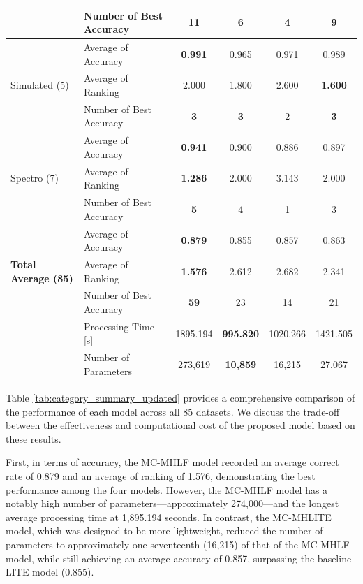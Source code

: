 \documentclass[conference]{IEEEtran}
\begin{document}
\begin{table}[tb]
{\begin{tabular}{llcccc}
      & Number of Best Accuracy & \textbf{11} & 6 & 4 & 9 \\
      \midrule
      \multirow{3}{*}{Simulated (5)} & Average of Accuracy & \textbf{0.991} & 0.965 & 0.971 & 0.989 \\
      & Average of Ranking & 2.000 & 1.800 & 2.600 & \textbf{1.600} \\
      & Number of Best Accuracy & \textbf{3} & \textbf{3} & 2 & \textbf{3} \\
      \midrule
      \multirow{3}{*}{Spectro (7)} & Average of Accuracy & \textbf{0.941} & 0.900 & 0.886 & 0.897 \\
      & Average of Ranking & \textbf{1.286} & 2.000 & 3.143 & 2.000 \\
      & Number of Best Accuracy & \textbf{5} & 4 & 1 & 3 \\
      \midrule[1pt]
      \multirow{3}{*}{\textbf{Total Average (85)}} & Average of Accuracy & \textbf{0.879} & 0.855 & 0.857 & 0.863 \\
      & Average of Ranking & \textbf{1.576} & 2.612 & 2.682 & 2.341 \\
      & Number of Best Accuracy & \textbf{59} & 23 & 14 & 21 \\
	& Processing Time [s] & 1895.194 & \textbf{995.820} & 1020.266 & 1421.505 \\
      & Number of Parameters & 273,619 & \textbf{10,859} & 16,215 & 27,067 \\
      \bottomrule
    \end{tabular}
  }
\end{table}


Table \ref{tab:category_summary_updated} provides a comprehensive comparison of the performance of each model across all 85 datasets.  We discuss the trade-off between the effectiveness and computational cost of the proposed model based on these results.


First, in terms of accuracy, the MC-MHLF model recorded an average correct rate of 0.879 and an average of ranking of 1.576, demonstrating the best performance among the four models. However, the MC-MHLF model has a notably high number of parameters—approximately 274,000—and the longest average processing time at 1,895.194 seconds. In contrast, the MC-MHLITE model, which was designed to be more lightweight, reduced the number of parameters to approximately one-seventeenth (16,215) of that of the MC-MHLF model, while still achieving an average accuracy of 0.857, surpassing the baseline LITE model (0.855).
\end{document}
